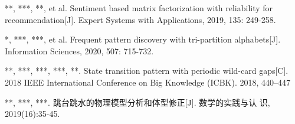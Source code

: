 
\begin{resume}
    \begin{enumerate}[label={[}\arabic*{]}, leftmargin=*]
        \item ***, ***, **, et al. Sentiment based matrix factorization with reliability for recommendation[J]. Expert Systems with Applications, 2019, 135: 249-258.
        \item **, ***, ***, et al. Frequent pattern discovery with tri-partition alphabets[J]. Information Sciences, 2020, 507: 715-732.
        \item ***, ***, ***, ***, **. State transition pattern with periodic wild-card gaps[C]. 2018 IEEE International Conference on Big Knowledge (ICBK). 2018, 440–447
        \item ***, ***, ***. 跳台跳水的物理模型分析和体型修正[J]. 数学的实践与认 识, 2019(16):35-45.
    \end{enumerate}
\end{resume}